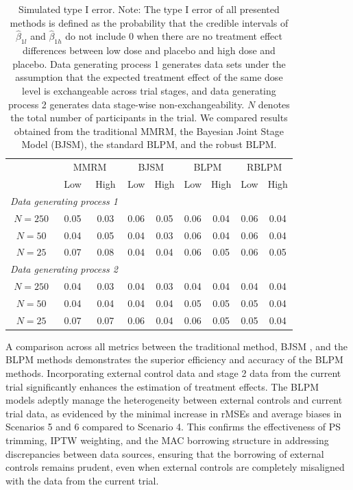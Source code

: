 \begin{table} 
\caption{\label{tab:TypeI_longitudinal} Simulated type I error. Note: The type I error of all presented methods is defined as the probability that the credible intervals of $\widehat{\beta}_{1l}$ and $\widehat{\beta}_{1h}$ do not include 0 when there are no treatment effect differences between low dose and placebo and high dose and placebo. Data generating process 1 generates data sets under the assumption that the expected treatment effect of the same dose level is exchangeable across trial stages, and data generating process 2 generates data stage-wise non-exchangeability. $N$ denotes the total number of participants in the trial. We compared results obtained from the traditional MMRM, the Bayesian Joint Stage Model (BJSM), the standard BLPM, and the robust BLPM.}
\centering
\begin{tabular}{ccccccccc}
\hline
\centering \multirow{2}{*}{Sample Size} & \multicolumn{2}{c}{MMRM} & \multicolumn{2}{c}{BJSM} & \multicolumn{2}{c}{BLPM} & \multicolumn{2}{c}{RBLPM}\\
\centering  & Low & High & Low & High & Low & High & Low & High \\
\hline
\multicolumn{3}{l}{\textit{Data generating process 1}} &&&& \\
$N = 250$ & 0.05 & 0.03  & 0.06 & 0.05 & 0.06 & 0.04 & 0.06 & 0.04 \\
$N = 50$ & 0.04 & 0.05  & 0.04 & 0.03 & 0.06 & 0.04 & 0.06 & 0.04 \\
$N = 25$ & 0.07 & 0.08 & 0.04 & 0.04 & 0.06 & 0.05 & 0.06 & 0.05 \\

\multicolumn{3}{l}{\textit{Data generating process 2}} &&&& \\
$N = 250$ & 0.04 & 0.03 & 0.04 & 0.03 & 0.04 & 0.04 & 0.04 & 0.04 \\
$N = 50$ & 0.04 & 0.04 & 0.04 & 0.04 & 0.05 & 0.05 & 0.05 & 0.04 \\
$N = 25$ & 0.07 & 0.07 & 0.06 & 0.04 & 0.06 & 0.05 & 0.05 & 0.04\\
\hline
\end{tabular}
\end{table}

A comparison across all metrics between the traditional method, \ac{BJSM} , and the \ac{BLPM} methods demonstrates the superior efficiency and accuracy of the \ac{BLPM} methods. Incorporating external control data and stage 2 data from the current trial significantly enhances the estimation of treatment effects. The \ac{BLPM} models adeptly manage the heterogeneity between external controls and current trial data, as evidenced by the minimal increase in rMSEs and average biases in Scenarios 5 and 6 compared to Scenario 4. This confirms the effectiveness of \ac{PS} trimming, \ac{IPTW} weighting, and the \ac{MAC} borrowing structure in addressing discrepancies between data sources, ensuring that the borrowing of external controls remains prudent, even when external controls are completely misaligned with the data from the current trial.


